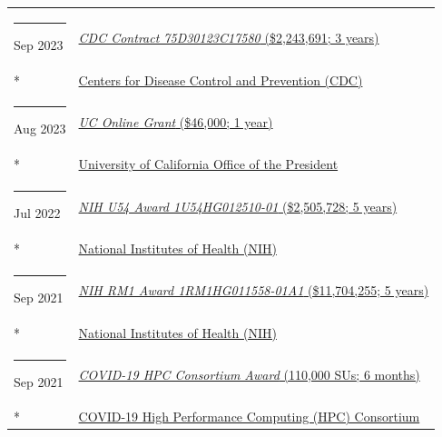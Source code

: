 \documentclass[margin,line]{res}
\begin{document}
\begin{resume}
\begin{longtable}{@{}p{0.7in}p{4in}}
\hspace*{-4mm} \rule{-1mm}{5mm} Sep 2023 & \href{https://www.usaspending.gov/award/CONT_AWD_75D30123C17580_7523_-NONE-_-NONE-}{\textit{CDC Contract 75D30123C17580} (\$2,243,691; 3 years)}\\*
\hspace*{-4mm} \hspace*{-4mm} & \hspace{4mm} \href{https://www.cdc.gov/}{Centers for Disease Control and Prevention (CDC)}\\
\hspace*{-4mm} \rule{-1mm}{5mm} Aug 2023 & \href{https://www.ucop.edu/uc-online/index.html}{\textit{UC Online Grant} (\$46,000; 1 year)}\\*
\hspace*{-4mm} \hspace*{-4mm} & \hspace{4mm} \href{https://www.ucop.edu/}{University of California Office of the President}\\
\hspace*{-4mm} \rule{-1mm}{5mm} Jul 2022 & \href{https://reporter.nih.gov/project-details/10307040}{\textit{NIH U54 Award 1U54HG012510-01} (\$2,505,728; 5 years)}\\*
\hspace*{-4mm} \hspace*{-4mm} & \hspace{4mm} \href{https://nih.gov}{National Institutes of Health (NIH)}\\
\hspace*{-4mm} \rule{-1mm}{5mm} Sep 2021 & \href{https://reporter.nih.gov/project-details/10307040}{\textit{NIH RM1 Award 1RM1HG011558-01A1} (\$11,704,255; 5 years)}\\*
\hspace*{-4mm} \hspace*{-4mm} & \hspace{4mm} \href{https://nih.gov}{National Institutes of Health (NIH)}\\
\hspace*{-4mm} \rule{-1mm}{5mm} Sep 2021 & \href{https://www.xsede.org/covid19-hpc-consortium}{\textit{COVID-19 HPC Consortium Award} (110,000 SUs; 6 months)}\\*
\hspace*{-4mm} \hspace*{-4mm} & \hspace{4mm} \href{https://covid19-hpc-consortium.org/}{COVID-19 High Performance Computing (HPC) Consortium}\\

\end{longtable}
\end{resume}
\end{document}
